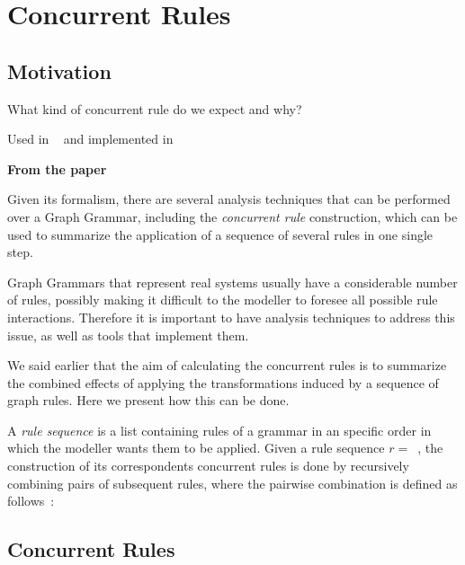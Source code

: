 \chapter{Concurrent Rules}

\section{Motivation}

What kind of concurrent rule do we expect and why?

Used in ~\cite{BezerraWEIT2016} and implemented in ~\cite{BezerraETMF2016}

\textbf{From the paper}

Given its formalism, there are several analysis techniques that can be performed over a Graph Grammar, including the \emph{concurrent rule} construction, which can be used to summarize the application of a sequence of several rules in one single step.

Graph Grammars that represent real systems usually have a considerable number of rules, possibly making it difficult to the modeller to foresee all possible rule interactions. Therefore it is important to have analysis techniques to address this issue, as well as tools that implement them.

We said earlier that the aim of calculating the concurrent rules is to summarize the combined effects of applying the transformations induced by a sequence of graph rules. Here we present how this can be done.

A \emph{rule sequence} is a list containing rules of a grammar in an specific order in which the modeller wants them to be applied. Given a rule sequence \mbox{$r =$ }, the construction of its correspondents concurrent rules is done by recursively combining pairs of subsequent rules, where the pairwise combination is defined as follows~\cite{Ehrig2006,Lambers2010}:  

\section{Concurrent Rules}

\begin{definition}

\end{definition}

